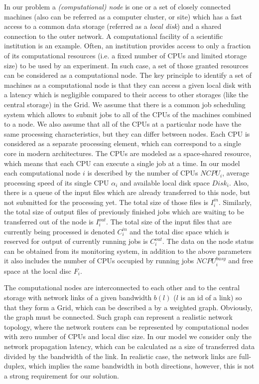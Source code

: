 \documentclass{svjour3}                     %
\begin{document}
In our problem a \textit{(computational) node} is one or a set of closely connected machines (also can be referred as a computer cluster, or site) which has a fast access to a common data storage (referred as a \textit{local disk}) and a shared connection to the outer network. A computational facility of a scientific institution is an example. Often, an institution provides  access to only a fraction of its computational resources (i.e. a fixed number of CPUs and limited storage size) to be used by an experiment. In such case, a set of those granted resources can be considered as a computational node. The key principle to identify a set of machines as a computational node is that they can access a given local disk with a latency which is negligible compared to their access to other storages (like the central storage) in the Grid. We assume that there is a common job scheduling system which allows to submit jobs to all of the CPUs of the machines combined to a node. We also assume that all of the CPUs at a particular node have the same processing characteristics, but they can differ between nodes. Each CPU is considered as a separate processing element, which can correspond to a single core in modern architectures. The CPUs are modeled as a space-shared resource, which means that each CPU can execute a single job at a time. In our model each computational node $i$ is described by the number of CPUs $NCPU_{i}$, average processing speed of its single CPU $\alpha_{i}$ and available local disk space $Disk_{i}$. Also, there is a queue of the input files which are already transferred to this node, but not submitted for the processing yet. The total size of those files is $I_{i}^{in}$. Similarly, the total size of output files of previously finished jobs which are waiting to be transferred out of the node is $I_{i}^{out}$. The total size of the input files that are currently being processed is denoted $C_{i}^{in}$ and the total disc space which is reserved for output of currently running jobs is $C_{i}^{out}$. The data on the node status can be obtained from its monitoring system, in addition to the above parameters it also includes the number of CPUs occupied by running jobs $NCPU_{i}^{busy}$ and free space at the local disc $F_{i}$.

The computational nodes are interconnected to each other and to the central storage with network links of a given bandwidth $b(l)$ ($l$ is an id of a link) so that they form a Grid, which can be described a by a weighted graph. Obviously, the graph must be connected. Such graph can represent a realistic network topology, where the network routers can be represented by computational nodes with zero number of CPUs and local disc size. In our model we consider only the network propagation latency, which can be calculated as a size of transferred data divided by the bandwidth of the link. In realistic case, the network links are full-duplex, which implies the same bandwidth in both directions, however, this is not a strong requirement for our solution.
\end{document}
